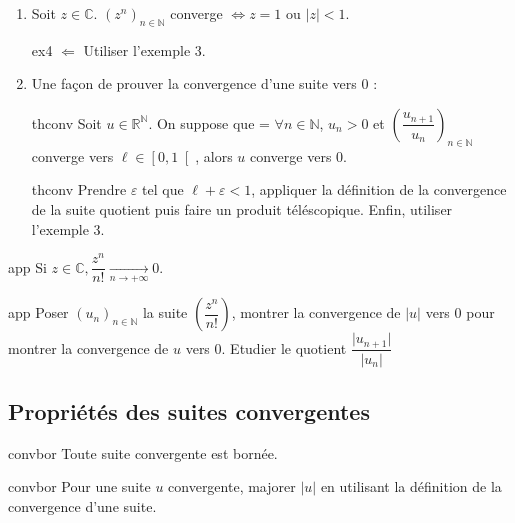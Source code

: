 \documentclass[12pt,a4paper]{report}
\begin{document}
\begin{exemple}[Exemples]
\begin{enumerate}
\item Soit $z \in \mathbb{C}$. $(z^n)_{n \in \mathbb{N}}$ converge $\Longleftrightarrow z=1$ ou $\lvert z \rvert < 1$.

\begin{principedemo}{ex4}
$\Longleftarrow$ Utiliser l'exemple 3.
\end{principedemo}


\item Une façon de prouver la convergence d'une suite vers $0$ : 
\begin{theoreme}{}{thconv}
Soit $u \in \mathbb{R}^\mathbb{N}$. On suppose que = $\forall n \in \mathbb{N}$, $u_n > 0$ et $\left(\dfrac{u_{n+1}}{u_n}\right)_{n \in \mathbb{N}}$ converge vers $\ell \in \left[0,1\right[$, alors $u$ converge vers $0$.
\end{theoreme}

\begin{principedemo}{thconv}
Prendre $\varepsilon$ tel que $\ell + \varepsilon < 1$, appliquer la définition de la convergence de la suite quotient puis faire un produit téléscopique. Enfin, utiliser l'exemple 3. \\
\end{principedemo} 

\end{enumerate}

\begin{application}{}{app}
Si $z \in \mathbb{C}, \dfrac{z^n}{n!} \xrightarrow[n \rightarrow +\infty]{} 0$.
\end{application} 

\begin{principedemo}{app}
Poser $(u_n)_{n \in \mathbb{N}}$ la suite $\left(\dfrac{z^n}{n!}\right)$, montrer la convergence de $\lvert u \rvert$ vers $0$ pour montrer la convergence de $u$ vers $0$. Etudier le quotient $\dfrac{\lvert u_{n+1}\rvert }{\lvert u_n \rvert}$
\end{principedemo}

\end{exemple}

\subsection{Propriétés des suites convergentes}

\begin{theoreme}{}{convbor}
Toute suite convergente est bornée.
\end{theoreme}

\begin{principedemo}{convbor}
Pour une suite $u$ convergente, majorer $\lvert u \rvert$ en utilisant la définition de la convergence d'une suite.
\end{principedemo}
\end{document}
